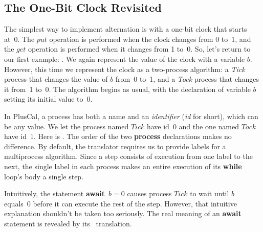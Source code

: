\documentclass[fleqn,leqno]{article}
\begin{document}
\subsection{The One-Bit Clock Revisited} 

The simplest way to implement alternation is with a one-bit clock that
starts at~0.  The $put$ operation is performed when the clock changes
from 0 to~1, and the $get$ operation is performed when it changes from
1 to~0.  So, let's return to our first example: .
%
We again represent the value of the clock with a variable $b$.  
However, this time we represent the clock as a two-process algorithm: a
\emph{Tick} process that changes the value of $b$ from~0 to~1, and a
\emph{Tock} process that changes it from~1 to~0.  The algorithm begins
as usual, with the declaration of variable $b$ setting its initial value
to~0.
\begin{display}
\begin{nopcal}
--algorithm TickTock  {
    variable b = 0 ;
\end{nopcal}
\begin{tlatex}
%
%
\end{tlatex}
\end{display}
In PlusCal, a 
process has both a name and an 
\emph{identifier} (\emph{id} for short), which can be any value.  We
let the process named $Tick$ have id~0 and the one named $Tock$ have
id~1.  Here is .  The order of the two \textbf{process} declarations makes
no difference.  By default, the translator requires us to provide
labels for a multiprocess algorithm.  Since a step consists of
execution from one label to the next, the single label in each process
makes an entire execution of its \textbf{while} loop's body a single
step.

 Intuitively, the statement
\textbf{await}~$b=0$ causes process $Tick$ to wait until $b$ equals~0
before it can execute the rest of the step.  However, that intuitive
explanation shouldn't be taken too seriously.  The real meaning of an
\textbf{await} statement is revealed by its
\tlaplus\ translation. 
\end{document}
